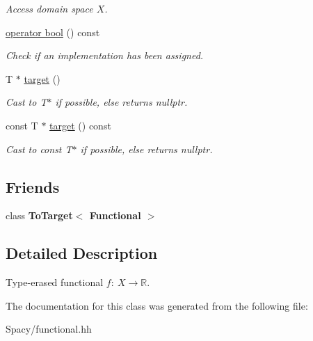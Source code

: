\begin{DoxyCompactItemize}
\begin{DoxyCompactList}\small\item\em Access domain space $X$. \end{DoxyCompactList}\item 
\hypertarget{classSpacy_1_1Functional_ae388ceabb999447b3f60402c3a6770b3}{}\hyperlink{classSpacy_1_1Functional_ae388ceabb999447b3f60402c3a6770b3}{operator bool} () const \label{classSpacy_1_1Functional_ae388ceabb999447b3f60402c3a6770b3}

\begin{DoxyCompactList}\small\item\em Check if an implementation has been assigned. \end{DoxyCompactList}\item 
\hypertarget{structSpacy_1_1Mixin_1_1ToTarget_a3510786172c63a074eda127276d13392}{}T $\ast$ \hyperlink{structSpacy_1_1Mixin_1_1ToTarget_a3510786172c63a074eda127276d13392}{target} ()\label{structSpacy_1_1Mixin_1_1ToTarget_a3510786172c63a074eda127276d13392}

\begin{DoxyCompactList}\small\item\em Cast to T$\ast$ if possible, else returns nullptr. \end{DoxyCompactList}\item 
\hypertarget{structSpacy_1_1Mixin_1_1ToTarget_a98985b22f6fc98d253c8416c54a5e359}{}const T $\ast$ \hyperlink{structSpacy_1_1Mixin_1_1ToTarget_a98985b22f6fc98d253c8416c54a5e359}{target} () const\label{structSpacy_1_1Mixin_1_1ToTarget_a98985b22f6fc98d253c8416c54a5e359}

\begin{DoxyCompactList}\small\item\em Cast to const T$\ast$ if possible, else returns nullptr. \end{DoxyCompactList}\end{DoxyCompactItemize}
\subsection*{Friends}
\begin{DoxyCompactItemize}
\item 
\hypertarget{classSpacy_1_1Functional_a70e1dbf73a7b8e18dcd903f6bb19aabe}{}class {\bfseries To\+Target$<$ Functional $>$}\label{classSpacy_1_1Functional_a70e1dbf73a7b8e18dcd903f6bb19aabe}

\end{DoxyCompactItemize}


\subsection{Detailed Description}
Type-\/erased functional $f:\ X \to \mathbb{R} $. 

The documentation for this class was generated from the following file\+:\begin{DoxyCompactItemize}
\item 
Spacy/functional.\+hh\end{DoxyCompactItemize}
